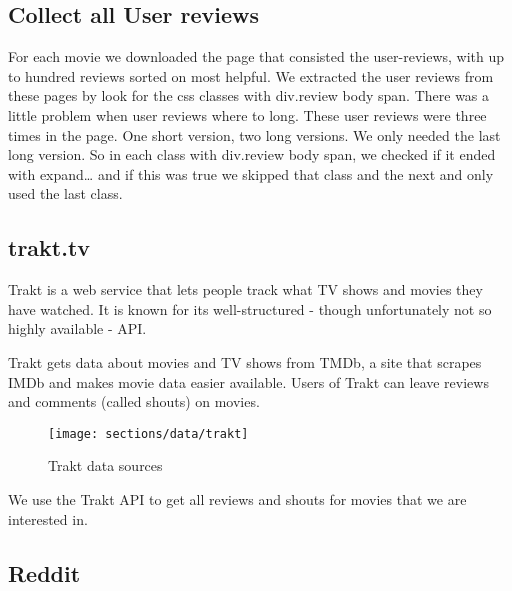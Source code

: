 \subsection{Collect all User reviews}
For each movie we downloaded the page that consisted the user-reviews, with up to hundred reviews sorted on most helpful. 
We extracted the user reviews from these pages by look for the css classes with div.review body span. 
There was a little problem when user reviews where to long. These user reviews were three times in the page. One short version, two long versions. 
We only needed the last long version. So in each class with  div.review body span, 
we checked if it ended with expand… and if this was true we skipped that class and the next and only used the last class. 

\subsection{trakt.tv}
\label{sec:data:trakt}
Trakt is a web service that lets people track what TV shows and movies they have watched.
It is known for its well-structured - though unfortunately not so highly available - API.

Trakt gets data about movies and TV shows from TMDb, a site that scrapes IMDb and makes movie data easier available.
Users of Trakt can leave reviews and comments (called shouts) on movies.

\begin{figure}[H]
	\centering
	\texttt{[image: sections/data/trakt]}
	\caption{Trakt data sources}
\end{figure}

We use the Trakt API to get all reviews and shouts for movies that we are interested in.

\subsection{Reddit}
\label{sec:data:reddit}
